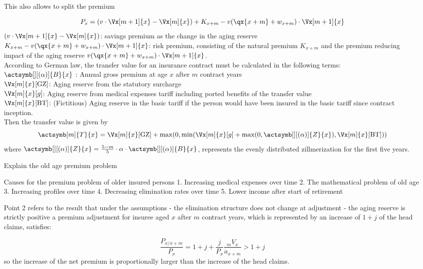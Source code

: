 \documentclass[11pt,a4paper,twoside]{article}
\begin{document}
This also allows to split the premium

\[P_x = (v\cdot \Vx[m+1]{x} - \Vx[m]{x}) + K_{x+m} - v(\qx{x+m} + w_{x+m})\cdot \Vx[m+1]{x} \]
\( (v\cdot \Vx[m+1]{x} - \Vx[m]{x}) \): savings premium as the change in the aging reserve \\
\( K_{x+m} - v(\qx{x+m} + w_{x+m})\cdot \Vx[m+1]{x} \): risk premium, consisting of the natural premium \( K_{x+m} \)
and the premium reducing impact of the aging reserve \( v(\qx{x+m} + w_{x+m})\cdot \Vx[m+1]{x} \). \\


According to German law, the transfer value for an insurance contract must be calculated in the following terms: \\
\( \actsymb[][(\alpha)]{B}{x} \) : Annual gross premium at age \(x\) after \( m \) contract years  \\
\( \Vx[m]{x}[\text{GZ}] \): Aging reserve from the statutory surcharge \\
\( \Vx[m]{x}[g] \): Aging reserve from medical expenses tariff including ported benefits of the transfer value \\
\( \Vx[m]{x}[\text{BT}] \): (Fictitious) Aging reserve in the basic tariff if the person would have been insured in the 
basic tariff since contract inception. \\

Then the transfer value is given by
\[ \actsymb[m]{T}{x} = \Vx[m]{x}[\text{GZ}] + \max(0, \min(\Vx[m]{x}[g] + \max(0,  \actsymb[][(\alpha)]{Z}{x}), \Vx[m]{x}[\text{BT}])) \]
where \( \actsymb[][(\alpha)]{Z}{x} = \frac{5 - m}{5} \cdot \alpha \cdot \actsymb[][(\alpha)]{B}{x} \),
represents the evenly distributed zillmerization for the first five years.


Explain the old age premium problem

Causes for the premium problem of older insured persons
1. Increasing medical expenses over time
2. The mathematical problem of old age
3. Increasing profiles over time
4. Decreasing elimination rates over time
5. Lower income after start of retirement

Point 2 refers to the result that under the assumptions
- the elimination structure does not change at adjustment
- the aging reserve is strictly positive
a premium adjustment for insuree aged \( x \) after \( m \) contract years,
which is represented by an increase of \( 1 + j \) of the head claims, satisfies:

\[
  \frac{P_{x / x+m }}{P_x} = 1 + j + \frac{j}{P_x} \frac{{}_m V_x}{\ddot{a}_{x+m}} > 1 + j
\]
so the increase of the net premium is proportionally larger than the increase of the head claims.
\end{document}
